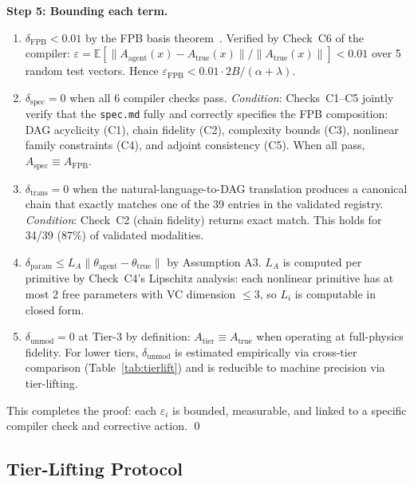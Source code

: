 \documentclass[11pt,a4paper]{article}
\newcommand{\eps}{\varepsilon}
\newcommand{\Atrue}{A_{\text{true}}}
\newcommand{\Aagent}{A_{\text{agent}}}
\begin{document}
\textbf{Step 5: Bounding each term.}
\begin{enumerate}[nosep, label=(\alph*)]
\item $\delta_{\text{FPB}} < 0.01$ by the FPB basis theorem~\cite{paperII}.  Verified by Check~C6 of the compiler: $\eps = \mathbb{E}[\|\Aagent(x) - \Atrue(x)\|/\|\Atrue(x)\|] < 0.01$ over 5 random test vectors.  Hence $\eps_{\text{FPB}} < 0.01 \cdot 2B/(\alpha + \lambda)$.

\item $\delta_{\text{spec}} = 0$ when all 6 compiler checks pass.  \emph{Condition}: Checks~C1--C5 jointly verify that the \texttt{spec.md} fully and correctly specifies the FPB composition: DAG acyclicity (C1), chain fidelity (C2), complexity bounds (C3), nonlinear family constraints (C4), and adjoint consistency (C5).  When all pass, $A_{\text{spec}} \equiv A_{\text{FPB}}$.

\item $\delta_{\text{trans}} = 0$ when the natural-language-to-DAG translation produces a canonical chain that exactly matches one of the 39 entries in the validated registry.  \emph{Condition}: Check~C2 (chain fidelity) returns exact match.  This holds for 34/39 (87\%) of validated modalities.

\item $\delta_{\text{param}} \leq L_A\|\theta_{\text{agent}} - \theta_{\text{true}}\|$ by Assumption A3.  $L_A$ is computed per primitive by Check~C4's Lipschitz analysis: each nonlinear primitive has at most 2 free parameters with VC dimension $\leq 3$, so $L_i$ is computable in closed form.

\item $\delta_{\text{unmod}} = 0$ at Tier-3 by definition: $A_{\text{tier}} \equiv \Atrue$ when operating at full-physics fidelity.  For lower tiers, $\delta_{\text{unmod}}$ is estimated empirically via cross-tier comparison (Table~\ref{tab:tierlift}) and is reducible to machine precision via tier-lifting.
\end{enumerate}

This completes the proof: each $\eps_i$ is bounded, measurable, and linked to a specific compiler check and corrective action. \qed

\subsection{Tier-Lifting Protocol}
\end{document}
